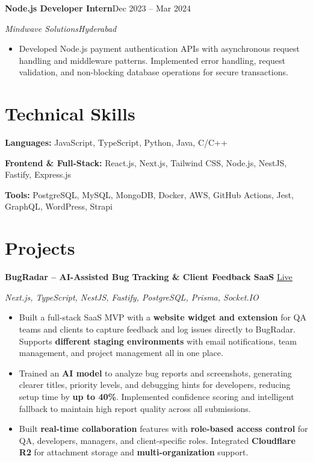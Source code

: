 \documentclass[a4paper,10pt]{article}
\newcommand{\resumeSubheading}[4]{%
  \Needspace{5\baselineskip}%
  \textbf{#1}\hfill #2\par
  \textit{#3}\hfill \textit{#4}\par
}
\newenvironment{resumeItems}{%
  \begin{itemize}[leftmargin=14pt,label=\textbullet,
    labelsep=5pt,topsep=3pt,itemsep=3pt,parsep=0pt,partopsep=0pt]
}{\end{itemize}\vspace{3pt}}
\begin{document}
\resumeSubheading
  {Node.js Developer Intern}{Dec 2023 -- Mar 2024}
  {Mindwave Solutions}{Hyderabad}
\begin{resumeItems}
  \item Developed Node.js payment authentication APIs with asynchronous request handling and middleware patterns. Implemented error handling, request validation, and non-blocking database operations for secure transactions.
\end{resumeItems}

\section{Technical Skills}
\textbf{Languages:} JavaScript, TypeScript, Python, Java, C/C++\par
\vspace{2pt}
\textbf{Frontend \& Full-Stack:} React.js, Next.js, Tailwind CSS, Node.js, NestJS, Fastify, Express.js\par
\vspace{2pt}
\textbf{Tools:} PostgreSQL, MySQL, MongoDB, Docker, AWS, GitHub Actions, Jest, GraphQL, WordPress, Strapi

\section{Projects}
\textbf{BugRadar -- AI-Assisted Bug Tracking \& Client Feedback SaaS}\hfill
\href{http://bugrader.site/}{\underline{Live}}\par
\textit{Next.js, TypeScript, NestJS, Fastify, PostgreSQL, Prisma, Socket.IO}\par
\begin{resumeItems}
  \item Built a full-stack SaaS MVP with a \textbf{website widget and extension} for QA teams and clients to capture feedback and log issues directly to BugRadar. Supports \textbf{different staging environments} with email notifications, team management, and project management all in one place.
  \item Trained an \textbf{AI model} to analyze bug reports and screenshots, generating clearer titles, priority levels, and debugging hints for developers, reducing setup time by \textbf{up to 40\%}. Implemented confidence scoring and intelligent fallback to maintain high report quality across all submissions.
  \item Built \textbf{real-time collaboration} features with \textbf{role-based access control} for QA, developers, managers, and client-specific roles. Integrated \textbf{Cloudflare R2} for attachment storage and \textbf{multi-organization} support.
\end{resumeItems}
\end{document}
